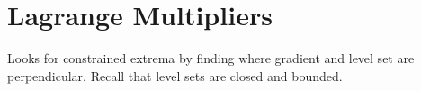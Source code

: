 \begin{comment}
\subsection*{First derivative test}
If:
\begin{enumerate}
\item $U\subset \mathbb{R}^n$ is open
\item the function $f:U\subset \mathbb{R}^n\to \mathbb{R}$ is differentiable
\item $\x_0$ is a local extremum
\end{enumerate}
then, $\textbf{D}f(\x_0)=\textbf{0}$, and $\x_0$ is a critical point of $f$.

\subsection*{Second derivative test}
If 
\begin{enumerate}
    \item $f:U\subset \mathbb{R}^n\to\mathbb{R}$ is $c^3$
    \item $\x_0\in U$ is a critical point of $f$
    \item $Hf(\x_0)$ hessian is positive definite
\end{enumerate}{}
then, $\x_0$ is a relative minimum of $f$. Similarly, if negative definite, relative maximum.


\subsubsection*{Summary of absolute extrema}
\begin{itemize}
    \item Locate critical points.
    \item Find all critical points viewed as function only on $\partial U$.
    \item Compute value of $f$ at all critical points.
    \item Compare values and select largest and smallest.
\end{itemize}
\end{comment}

\section*{Lagrange Multipliers}
Looks for constrained extrema by finding where gradient and level set are perpendicular. Recall that level sets are closed and bounded.

